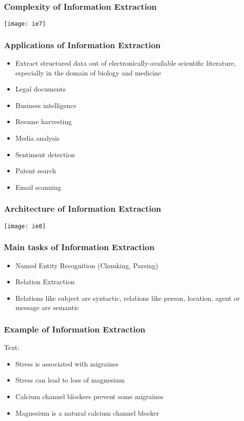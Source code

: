 \begin{frame}[fragile]
  \frametitle{Complexity of Information Extraction}
\begin{center}
\texttt{[image: ie7]}
\end{center}
\end{frame}

\begin{frame}[fragile]
  \frametitle{Applications of Information Extraction}
  \begin{itemize}
    \item Extract structured data out of electronically-available scientific literature, especially in the domain of biology and medicine 
    \item Legal documents
    \item Business intelligence
    \item Resume harvesting
    \item Media analysis
    \item Sentiment detection
    \item Patent search
    \item Email scanning
  \end{itemize}
\end{frame}

\begin{frame}[fragile]
  \frametitle{Architecture of Information Extraction}
\begin{center}
\texttt{[image: ie8]}
\end{center}
\end{frame}

\begin{frame}[fragile]
  \frametitle{Main tasks of Information Extraction}
  \begin{itemize}
    \item Named Entity Recognition (Chunking, Parsing)
    \item Relation Extraction 
    \item Relations like subject are syntactic, relations like person, location, agent or message are semantic
  \end{itemize}
\end{frame}

\begin{frame}[fragile]
  \frametitle{Example of Information Extraction}
Text:
  \begin{itemize}
    \item Stress is associated with migraines 
    \item Stress can lead to loss of magnesium 
    \item Calcium channel blockers prevent some migraines 
    \item Magnesium is a natural calcium channel blocker
  \end{itemize}
\end{frame}

